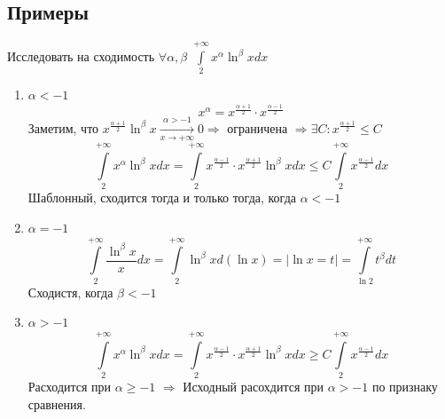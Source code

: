 \documentclass{article}
\begin{document}
\subsection{Примеры}
Исследовать на сходимость $\forall \alpha, \beta$ $\int\limits_2^{+\infty}x^\alpha \ln^\beta x dx$
\begin{enumerate}
    \item $\alpha < -1 $
            $$x^\alpha = x^{\frac{\alpha +1}{2}}\cdot x^\frac{\alpha - 1}{2}  $$
    Заметим, что $x^\frac{\alpha + 1}{2} \ln^\beta x \xrightarrow[x\to+\infty]{\alpha > -1} 0 \Rightarrow $ ограничена $\Rightarrow \exists C: x^\frac{\alpha + 1}{2} \leq C$ \
    $$ \int\limits_2^{+\infty} x^\alpha \ln^\beta x dx = \int\limits_2^{+\infty}x^\frac{\alpha - 1}{2} \cdot x^\frac{\alpha + 1}{2}\ln^\beta x dx \leq C\int\limits_2^{+\infty} x^\frac{\alpha -1}{2}dx$$
    Шаблонный, сходится тогда и только тогда, когда $\alpha < -1$
    \item $\alpha = -1$
    $$ \int\limits_2^{+\infty}\frac{\ln^\beta x}{x}dx = \int\limits_2^{+\infty}\ln^\beta x d(\ln x) =|\ln x = t| = \int\limits_{\ln 2}^{+\infty} t^\beta dt$$
    Сходистя, когда $\beta < -1$
    \item $\alpha > -1 $
    $$ \int\limits_2^{+\infty}x^\alpha \ln^\beta x dx = \int\limits_2^{+\infty} x^\frac{\alpha -1}{2}\cdot x^\frac{\alpha +1}{2}\ln^\beta x dx \geq C\int\limits_2^{+\infty} x^\frac{\alpha -1}{2}dx $$
    Расходится при $\alpha \geq -1$ $\Rightarrow$ Исходный расохдится при $\alpha > -1$ по признаку сравнения.
\end{enumerate}
\end{document}
